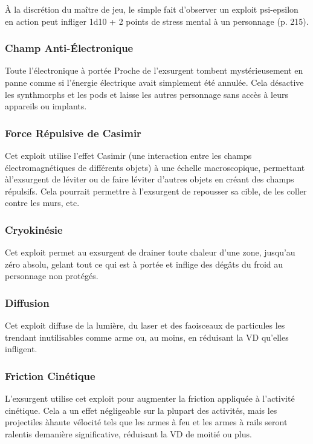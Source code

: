 À la discrétion du maître de jeu, le simple fait d'observer un exploit psi-epsilon en action peut infliger 1d10 + 2 points de stress mental à un personnage (p. 215). 

\subsubsection{Champ Anti-Électronique} 

Toute l'électronique à portée Proche de l'exsurgent tombent mystérieusement en panne comme si l'énergie électrique avait simplement été annulée. Cela désactive les synthmorphs et les pods et laisse les autres personnage sans accès à leurs appareils ou implants. 

\subsubsection{Force Répulsive de Casimir} 

Cet exploit utilise l'effet Casimir (une interaction entre les champs électromagnétiques de différents objets) à une échelle macroscopique, permettant àl'exsurgent de léviter ou de faire léviter d'autres objets en créant des champs répulsifs. Cela pourrait permettre à l'exsurgent de repousser sa cible, de les coller contre les murs, etc. 

\subsubsection{Cryokinésie} 

Cet exploit permet au exsurgent de drainer toute chaleur d'une zone, jusqu'au zéro absolu, gelant tout ce qui est à portée et inflige des dégâts du froid au personnage non protégés. 

\subsubsection{Diffusion} 

Cet exploit diffuse de la lumière, du laser et des faoisceaux de particules les trendant inutilisables comme arme ou, au moins, en réduisant la VD qu'elles infligent. 

\subsubsection{Friction Cinétique} 

L'exsurgent utilise cet exploit pour augmenter la friction appliquée à l'activité cinétique. Cela a un effet négligeable sur la plupart des activités, mais les projectiles àhaute vélocité tels que les armes à feu et les armes à rails seront ralentis demanière significative, réduisant la VD de moitié ou plus. 

